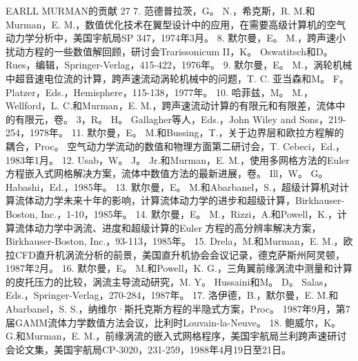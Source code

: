 \documentclass[UTF8,11pt,a4paper,openany,fontset=fandol]{ctexbook}
\begin{document}
EARLL MURMAN的贡献 27 7. 范德普拉茨，G。 N.，希克斯，R. M.和Murman，E. M.，数值优化技术在翼型设计中的应用，在需要高级计算机的空气动力学分析中，美国宇航局SP 347，1974年3月。 8. 默尔曼，E。 M.，跨声速小扰动方程的一些数值解回顾，研讨会Trarissonicum II，K。 Oswatitsch和D。 Rues，编辑，Springer-Verlag，415-422，1976年。 9. 默尔曼，E。 M.，涡轮机械中超音速电位流的计算，跨声速流动涡轮机械中的问题，T. C. 亚当森和M。 F。 Platzer，Eds.，Hemisphere，115-138，1977年。 10. 哈菲兹，M。 M.，Wellford，L. C.和Murman，E. M.，跨声速流动计算的有限元和有限差，流体中的有限元，卷。 3，R。 H。 Gallagher等人，Eds.，John Wiley and Sons，219-254，1978年。 11. 默尔曼，E。 M.和Bussing，T.，关于边界层和欧拉方程解的耦合，Proc。 空气动力学流动的数值和物理方面第二研讨会，T. Cebeci，Ed.，1983年1月。 12. Usab，W。 J。 Jr.和Murman，E. M.，使用多网格方法的Euler 方程嵌入式网格解决方案，流体中数值方法的最新进展，卷。 Ill，W。 G。 Habashi，Ed.，1985年。 13. 默尔曼，E。 M.和Abarbanel，S.，超级计算机对计算流体动力学未来十年的影响，计算流体动力学的进步和超级计算，Birkhauser-Boston, Inc.，1-10，1985年。 14. 默尔曼，E。 M.，Rizzi，A.和Powell，K.，计算流体动力学中涡流、进度和超级计算的Euler 方程的高分辨率解决方案，Birkhauser-Boston, Inc.，93-113，1985年。 15. Drela，M.和Murman，E. M.，欧拉CFD直升机涡流分析的前景，美国直升机协会会议记录，德克萨斯州阿灵顿，1987年2月。 16. 默尔曼，E。 M.和Powell，K. G.，三角翼前缘涡流中测量和计算的皮托压力的比较，涡流主导流动研究，M. Y。 Hussaini和M。 D。 Salas，Eds.，Springer-Verlag，270-284，1987年。 17. 洛伊德，B.，默尔曼，E. M.和Abarbanel，S. S.，纳维尔·斯托克斯方程的半隐式方案，Proc。 1987年9月，第7届GAMM流体力学数值方法会议，比利时Louvain-la-Neuve。 18. 鲍威尔，K。 G.和Murman，E. M.，前缘涡流的嵌入式网格程序，美国宇航局兰利跨声速研讨会论文集，美国宇航局CP-3020，231-259，1988年4月19日至21日。
\end{document}
